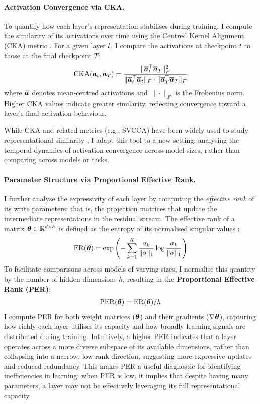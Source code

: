 \paragraph{Activation Convergence via CKA.}
To quantify how each layer's representation stabilises during training, I compute the similarity of its activations over time using the Centred Kernel Alignment (CKA) metric \citep{kornblith2019cka}. For a given layer $l$, I compare the activations at checkpoint $t$ to those at the final checkpoint $T$:
\begin{align}
    \mathrm{CKA}(\overline{\boldsymbol{a}}_{t}, \overline{\boldsymbol{a}}_{T}) = 
    \frac{\|\overline{\boldsymbol{a}}_{t}^{\top} \overline{\boldsymbol{a}}_{T}\|_F^2}
         {\|\overline{\boldsymbol{a}}_{t}^{\top} \overline{\boldsymbol{a}}_{t}\|_F \cdot \|\overline{\boldsymbol{a}}_{T}^{\top} \overline{\boldsymbol{a}}_{T}\|_F}
\end{align}
where $\overline{\boldsymbol{a}}$ denotes mean-centred activations and $\|\cdot\|_F$ is the Frobenius norm. Higher CKA values indicate greater similarity, reflecting convergence toward a layer's final activation behaviour.

While CKA and related metrics (e.g., SVCCA) have been widely used to study representational similarity \citep{wu2020similarity, phang2021finetuned, brown2023understanding}, I adapt this tool to a new setting: analysing the temporal dynamics of activation convergence across model sizes, rather than comparing across models or tasks.

\paragraph{Parameter Structure via Proportional Effective Rank.}
I further analyse the expressivity of each layer by computing the \textit{effective rank} of its write parameters; that is, the projection matrices that update the intermediate representations in the residual stream. The effective rank of a matrix $\boldsymbol{\theta} \in \mathbb{R}^{d \times h}$ is defined as the entropy of its normalised singular values \citep{roy2007effectiverank}:
\begin{align}
    \mathrm{ER}(\boldsymbol{\theta}) = \exp\left(-\sum_{k=1}^K \frac{\sigma_k}{\|\sigma\|_1} \log \frac{\sigma_k}{\|\sigma\|_1}\right)
\end{align}
To facilitate comparisons across models of varying sizes, I normalise this quantity by the number of hidden dimensions $h$, resulting in the \textbf{Proportional Effective Rank (PER)}:
\begin{align}
    \mathrm{PER}(\boldsymbol{\theta}) = \mathrm{ER}(\boldsymbol{\theta}) / h
\end{align}
I compute PER for both weight matrices ($\boldsymbol{\theta}$) and their gradients ($\nabla \boldsymbol{\theta}$), capturing how richly each layer utilises its capacity and how broadly learning signals are distributed during training. Intuitively, a higher PER indicates that a layer operates across a more diverse subspace of its available dimensions, rather than collapsing into a narrow, low-rank direction, suggesting more expressive updates and reduced redundancy. This makes PER a useful diagnostic for identifying inefficiencies in learning: when PER is low, it implies that despite having many parameters, a layer may not be effectively leveraging its full representational capacity.


